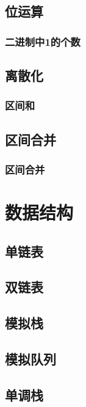 \documentclass[10pt,a4paper]{article}
\begin{document}
\subsection{位运算}
\subsubsection{二进制中1的个数}

\subsection{离散化}
\subsubsection{区间和}
\begin{spacing}{1.5}

\end{spacing}

\subsection{区间合并}
\subsubsection{区间合并}

\section{数据结构}
\subsection{单链表}

\subsection{双链表}

\subsection{模拟栈}

\subsection{模拟队列}

\subsection{单调栈}

\end{document}
